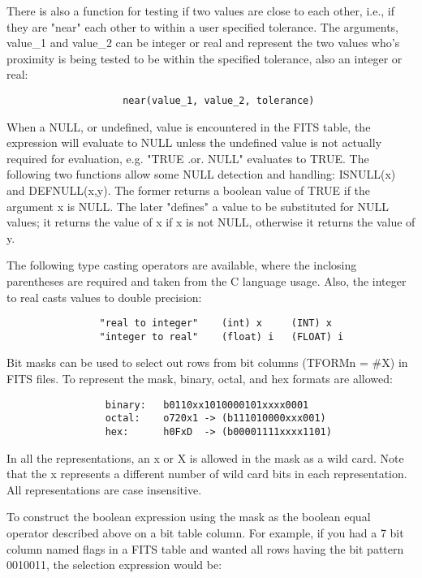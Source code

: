 \documentclass[11pt]{book}
\begin{document}
    There is also a function for testing if  two  values  are  close  to
    each  other,  i.e.,  if  they are "near" each other to within a user
    specified tolerance. The  arguments,  value\_1  and  value\_2  can  be
    integer  or  real  and  represent  the two values who's proximity is
    being tested to be within the specified tolerance, also  an  integer
    or real:

\begin{verbatim}
                    near(value_1, value_2, tolerance)
\end{verbatim}
    When  a  NULL, or undefined, value is encountered in the FITS table,
    the expression will evaluate to NULL unless the undefined  value  is
    not   actually   required  for  evaluation,  e.g. "TRUE  .or.  NULL"
    evaluates to TRUE. The  following  two  functions  allow  some  NULL
    detection  and  handling:  ISNULL(x)  and  DEFNULL(x,y).  The former
    returns a boolean value of TRUE if the  argument  x  is  NULL.   The
    later  "defines"  a  value  to  be  substituted  for NULL values; it
    returns the value of x if x is not NULL, otherwise  it  returns  the
    value of y.

    The  following  type  casting  operators  are  available,  where the
    inclosing parentheses are required and taken  from  the  C  language
    usage. Also, the integer to real casts values to double precision:

\begin{verbatim}
                "real to integer"    (int) x     (INT) x
                "integer to real"    (float) i   (FLOAT) i
\end{verbatim}

    Bit  masks can be used to select out rows from bit columns (TFORMn =
    \#X) in FITS files. To represent the mask,  binary,  octal,  and  hex
    formats are allowed:


\begin{verbatim}
                 binary:   b0110xx1010000101xxxx0001
                 octal:    o720x1 -> (b111010000xxx001)
                 hex:      h0FxD  -> (b00001111xxxx1101)
\end{verbatim}

    In  all  the  representations, an x or X is allowed in the mask as a
    wild card. Note that the x represents a  different  number  of  wild
    card  bits  in  each  representation.  All  representations are case
    insensitive.

    To construct the boolean expression using the mask  as  the  boolean
    equal  operator  described above on a bit table column. For example,
    if you had a 7 bit column named flags in a  FITS  table  and  wanted
    all  rows  having  the bit pattern 0010011, the selection expression
    would be:
\end{document}
